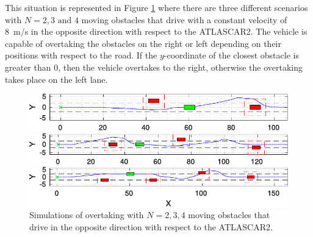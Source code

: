 This situation is represented in Figure \ref{fig:obstacleAvoidance_random}
where there are three different scenarios with $N = 2,3 \text{ and } 4$ moving obstacles that drive with a constant velocity of \SI{8}{m/s} in the opposite direction with respect to the ATLASCAR2. The vehicle is capable of overtaking the obstacles on the right or left depending on their positions with respect to the road. If the $y$-coordinate of the closest obstacle is greater than 0, then the vehicle overtakes to the right, otherwise the overtaking takes place on the left lane.
\begin{figure}[!h]
	\centering
	\begin{minipage}[t]{\textwidth}
		\includegraphics[width=\textwidth]{./figure/random_N_obstacles/overtaking_random_2.pdf}
	\end{minipage}
	\begin{minipage}[t]{\textwidth}
		\includegraphics[width=\textwidth]{./figure/random_N_obstacles/overtaking_random.pdf}
	\end{minipage}
	\begin{minipage}[t]{\textwidth}
		\includegraphics[width=\textwidth]{./figure/random_N_obstacles/overtaking_random_1.pdf}
	\end{minipage}
	\caption{Simulations of overtaking with $N = 2,3,4$ moving obstacles that drive in the opposite direction with respect to the ATLASCAR2.}
	\label{fig:obstacleAvoidance_random}
\end{figure}

